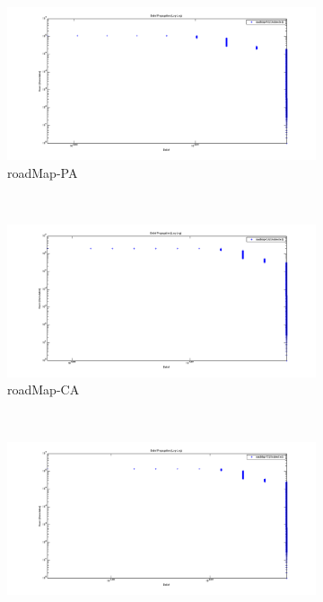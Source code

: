 \addtocounter{figure}{-1}

\begin{figure} 
    \addtocounter{figure}{1}
    \centering 
        \begin{subfigure}[htbp]{0.9\textwidth}
                \includegraphics[width=\textwidth]{FIG/bp-pa.png}
                \caption{roadMap-PA}
                \label{fig:bp-pa}
        \end{subfigure}
        ~ %
        \begin{subfigure}[htbp]{0.9\textwidth}
                \includegraphics[width=\textwidth]{FIG/bp-ca.png}
                \caption{roadMap-CA}
                \label{fig:bp-ca}
        \end{subfigure}
        ~ %
        \begin{subfigure}[htbp]{0.9\textwidth}
                \includegraphics[width=\textwidth]{FIG/bp-tx.png}

\end{subfigure}
\end{figure}
